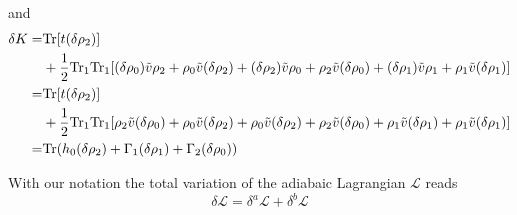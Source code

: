   and 
  \begin{equation}
    \begin{aligned}
      \delta K =& {\rm Tr}[ t(\delta\rho_2) ] \\  \label{tdhf88}
       &+ \frac{1}{2}{\rm Tr}_1{\rm Tr}_1[ (\delta\rho_0)\tilde{v}\rho_2 + \rho_0\tilde{v}(\delta\rho_2) + (\delta\rho_2)\tilde{v}\rho_0 + \rho_2\tilde{v}(\delta\rho_0) + (\delta\rho_1)\tilde{v}\rho_1 + \rho_1\tilde{v}(\delta\rho_1) ]\\
      =& {\rm Tr}[ t(\delta\rho_2) ] \\
       &+ \frac{1}{2}{\rm Tr}_1{\rm Tr}_1[ \rho_2\tilde{v}(\delta\rho_0) + \rho_0\tilde{v}(\delta\rho_2) + \rho_0\tilde{v}(\delta\rho_2) + \rho_2\tilde{v}(\delta\rho_0) + \rho_1\tilde{v}(\delta\rho_1) + \rho_1\tilde{v}(\delta\rho_1) ]\\
      =& {\rm Tr}(h_0(\delta\rho_2) + \Gamma_1(\delta\rho_1) + \Gamma_2(\delta\rho_0))
    \end{aligned}
  \end{equation}

  With our notation the total variation of the adiabaic Lagrangian $\mathscr{L}$ reads
  \begin{equation}
    \delta\mathscr{L} = \delta^a\mathscr{L} + \delta^b\mathscr{L}
  \end{equation}
 
